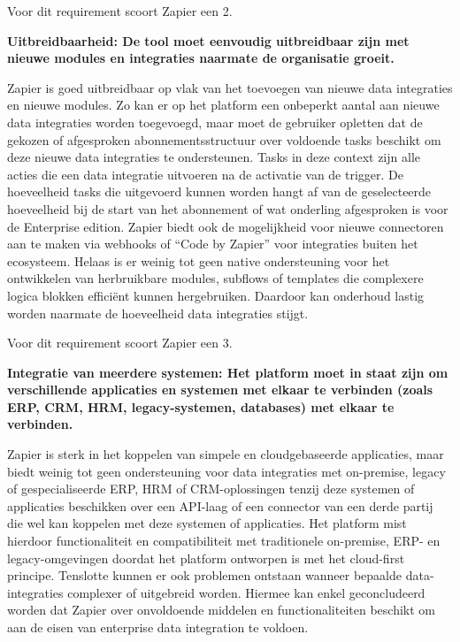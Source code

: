 Voor dit requirement scoort Zapier een 2.

\vspace{\baselineskip}

\textbf{Uitbreidbaarheid: De tool moet eenvoudig uitbreidbaar zijn met nieuwe modules en integraties naarmate de organisatie groeit.}

\vspace{\baselineskip}

Zapier is goed uitbreidbaar op vlak van het toevoegen van nieuwe data integraties en nieuwe modules. Zo kan er op het platform een onbeperkt aantal aan nieuwe data integraties worden toegevoegd, maar moet de gebruiker opletten dat de gekozen of afgesproken abonnementsstructuur over voldoende tasks beschikt om deze nieuwe data integraties te ondersteunen. Tasks in deze context zijn alle acties die een data integratie uitvoeren na de activatie van de trigger. De hoeveelheid tasks die uitgevoerd kunnen worden hangt af van de geselecteerde hoeveelheid bij de start van het abonnement of wat onderling afgesproken is voor de Enterprise edition. Zapier biedt ook de mogelijkheid voor nieuwe connectoren aan te maken via webhooks of “Code by Zapier” voor integraties buiten het ecosysteem. Helaas is er weinig tot geen native ondersteuning voor het ontwikkelen van herbruikbare modules, subflows of templates die complexere logica blokken efficiënt kunnen hergebruiken. Daardoor kan onderhoud lastig worden naarmate de hoeveelheid data integraties stijgt.


Voor dit requirement scoort Zapier een 3.

\vspace{\baselineskip}

\textbf{Integratie van meerdere systemen: Het platform moet in staat zijn om verschillende applicaties en systemen met elkaar te verbinden (zoals ERP, CRM, HRM, legacy-systemen, databases) met elkaar te verbinden.}

\vspace{\baselineskip}

Zapier is sterk in het koppelen van simpele en cloudgebaseerde applicaties, maar biedt weinig tot geen ondersteuning voor data integraties met on-premise, legacy of gespecialiseerde ERP, HRM of CRM-oplossingen tenzij deze systemen of applicaties beschikken over een API-laag of een connector van een derde partij die wel kan koppelen met deze systemen of applicaties. Het platform mist hierdoor functionaliteit en compatibiliteit met traditionele on-premise, ERP- en legacy-omgevingen doordat het platform ontworpen is met het cloud-first principe. Tenslotte kunnen er ook problemen ontstaan wanneer bepaalde data-integraties complexer of uitgebreid worden. Hiermee kan enkel geconcludeerd worden dat Zapier over onvoldoende middelen en functionaliteiten beschikt om aan de eisen van enterprise data integration te voldoen.

